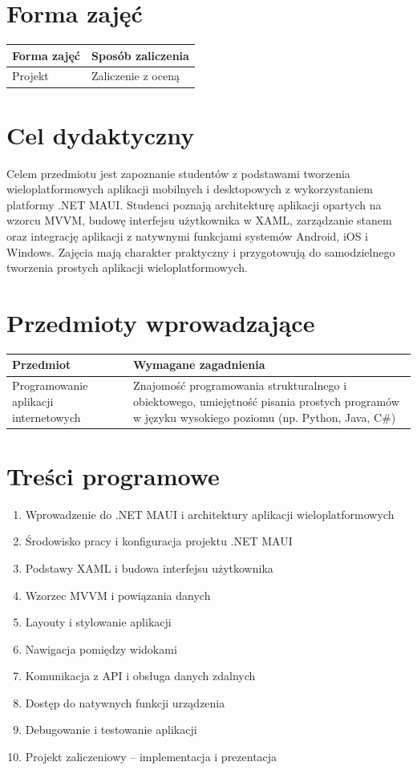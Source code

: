 \documentclass[12pt, a4paper]{article}
\begin{document}
\section{Forma zajęć}

\begin{tabular}{ll}
  \hline
  \textbf{Forma zajęć} & \textbf{Sposób zaliczenia} \\
  \hline
  Projekt & Zaliczenie z oceną \\
  \hline
\end{tabular}

\section{Cel dydaktyczny}

Celem przedmiotu jest zapoznanie studentów z podstawami tworzenia wieloplatformowych aplikacji mobilnych i desktopowych z wykorzystaniem platformy .NET MAUI. Studenci poznają architekturę aplikacji opartych na wzorcu MVVM, budowę interfejsu użytkownika w XAML, zarządzanie stanem oraz integrację aplikacji z natywnymi funkcjami systemów Android, iOS i Windows. Zajęcia mają charakter praktyczny i przygotowują do samodzielnego tworzenia prostych aplikacji wieloplatformowych.

\section{Przedmioty wprowadzające}

\begin{tabularx}{\textwidth}{lX}
  \hline
  \textbf{Przedmiot} & \textbf{Wymagane zagadnienia} \\
  \hline
  Programowanie aplikacji internetowych & Znajomość programowania strukturalnego i obiektowego, umiejętność pisania prostych programów w języku wysokiego poziomu (np. Python, Java, C\#) \\
  \hline
\end{tabularx}

\section{Treści programowe}

\begin{enumerate}
  \item Wprowadzenie do .NET MAUI i architektury aplikacji wieloplatformowych
  \item Środowisko pracy i konfiguracja projektu .NET MAUI
  \item Podstawy XAML i budowa interfejsu użytkownika
  \item Wzorzec MVVM i powiązania danych
  \item Layouty i stylowanie aplikacji
  \item Nawigacja pomiędzy widokami
  \item Komunikacja z API i obsługa danych zdalnych
  \item Dostęp do natywnych funkcji urządzenia
  \item Debugowanie i testowanie aplikacji
  \item Projekt zaliczeniowy – implementacja i prezentacja
\end{enumerate}
\end{document}
